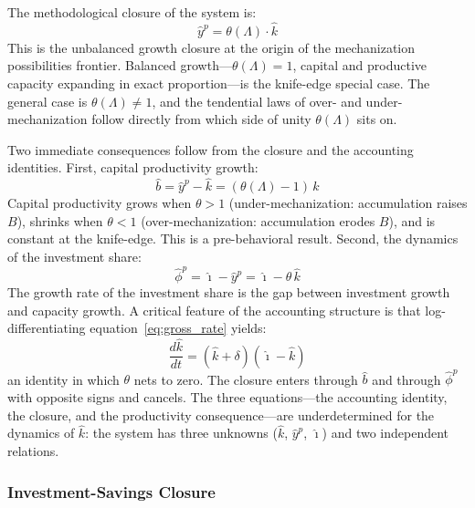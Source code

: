 The methodological closure of the system is:
%
\begin{equation}\label{eq:closure}
	\hat{y}^p = \theta(\Lambda) \cdot \hat{k}
\end{equation}
%
This is the unbalanced growth closure at the origin of the mechanization possibilities frontier. Balanced growth---$\theta(\Lambda) = 1$, capital and productive capacity expanding in exact proportion---is the knife-edge special case. The general case is $\theta(\Lambda) \neq 1$, and the tendential laws of over- and under-mechanization follow directly from which side of unity $\theta(\Lambda)$ sits on.

Two immediate consequences follow from the closure and the accounting identities. First, capital productivity growth:
%
\begin{equation}\label{eq:bhat}
	\hat{b} = \hat{y}^p - \hat{k} = (\theta(\Lambda) - 1)\,\hat{k}
\end{equation}
%
Capital productivity grows when $\theta > 1$ (under-mechanization: accumulation raises $B$), shrinks when $\theta < 1$ (over-mechanization: accumulation erodes $B$), and is constant at the knife-edge. This is a pre-behavioral result. Second, the dynamics of the investment share:
%
\begin{equation}\label{eq:phihat}
	\hat{\phi}^p = \hat{\imath} - \hat{y}^p = \hat{\imath} - \theta\,\hat{k}
\end{equation}
%
The growth rate of the investment share is the gap between investment growth and capacity growth. A critical feature of the accounting structure is that log-differentiating equation~\eqref{eq:gross_rate} yields:
%
\begin{equation}\label{eq:khat_accel}
	\frac{d\hat{k}}{dt} = (\hat{k} + \delta)(\hat{\imath} - \hat{k})
\end{equation}
%
an identity in which $\theta$ nets to zero. The closure enters through $\hat{b}$ and through $\hat{\phi}^p$ with opposite signs and cancels. The three equations---the accounting identity, the closure, and the productivity consequence---are underdetermined for the dynamics of $\hat{k}$: the system has three unknowns ($\hat{k}$, $\hat{y}^p$, $\hat{\imath}$) and two independent relations.



\subsubsection{Investment-Savings Closure}
\label{sec:IS_closure}

